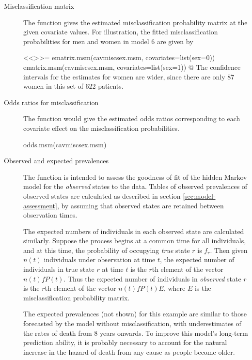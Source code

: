 \begin{description}
\item[Misclassification matrix] The function 
gives the estimated misclassification probability matrix at the given
covariate values.  For illustration, the fitted misclassification
probabilities for men and women in model 6 are given by

<<>>=
ematrix.msm(cavmiscsex.msm, covariates=list(sex=0))
ematrix.msm(cavmiscsex.msm, covariates=list(sex=1))
@
The confidence intervals for the estimates for women are wider, since
there are only 87 women in this set of 622 patients.

\item[Odds ratios for misclassification] The function
   would give the estimated odds ratios corresponding to
  each covariate effect on the misclassification probabilities.

\begin{Scode}
odds.msm(cavmiscsex.msm)
\end{Scode}


\item[Observed and expected prevalences]

  The function  is intended to assess the
  goodness of fit of the hidden Markov model for the \emph{observed}
  states to the data.  Tables of observed prevalences of observed
  states are calculated as described in
  section \ref{sec:model-assessment}, by assuming that observed states
  are retained between observation times.

  The expected numbers of individuals in each observed state are
  calculated similarly. Suppose the process begins at a common time
  for all individuals, and at this time, the probability of occupying
  \emph{true} state $r$ is $f_r$.  Then given $n(t)$ individuals under
  observation at time $t$, the expected number of individuals in true
  state $r$ at time $t$ is the $r$th element of the vector $n(t) f
  P(t)$. Thus the expected number of individuals in \emph{observed}
  state $r$ is the $r$th element of the vector $n(t) f P(t) E$, where
  $E$ is the misclassification probability matrix.

  The expected prevalences (not shown) for this example are similar to
  those forecasted by the model without misclassification, with
  underestimates of the rates of death from 8 years onwards.  To
  improve this model's long-term prediction ability, it is probably
  necessary to account for the natural increase in the hazard of death
  from any cause as people become older.


\end{description}
